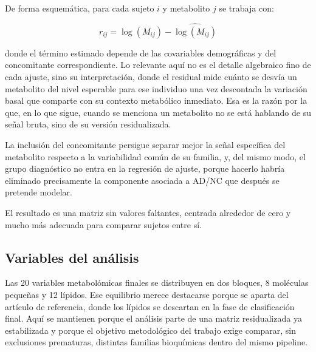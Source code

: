 De forma esquemática, para cada sujeto $i$ y metabolito $j$ se trabaja con:

\begin{equation}\label{eq:residuales}
r_{ij} = \log(M_{ij}) - \widehat{\log(M_{ij})}
\end{equation}

donde el término estimado depende de las covariables demográficas y del concomitante correspondiente. Lo relevante aquí
no es el detalle algebraico fino de cada ajuste, sino su interpretación, donde el residual mide cuánto se desvía un
metabolito del nivel esperable para ese individuo una vez descontada la variación basal que comparte con su contexto
metabólico inmediato. Esa es la razón por la que, en lo que sigue, cuando se menciona un metabolito no se está hablando
de su señal bruta, sino de su versión residualizada.

La inclusión del concomitante persigue separar mejor la señal específica del metabolito respecto a la variabilidad común
de su familia, y, del mismo modo, el grupo diagnóstico no entra en la regresión de ajuste, porque hacerlo habría
eliminado precisamente la componente asociada a AD/NC que después se pretende modelar.

El resultado es una matriz sin valores faltantes, centrada alrededor de cero y mucho más adecuada para comparar sujetos
entre sí.

\subsection{Variables del análisis}\label{sec:variables}

Las 20 variables metabolómicas finales se distribuyen en dos bloques, 8 moléculas pequeñas y 12 lípidos. Ese equilibrio
merece destacarse porque se aparta del artículo de referencia, donde los lípidos se descartan en la fase de
clasificación final. Aquí se mantienen porque el análisis parte de una matriz residualizada ya estabilizada y porque el
objetivo metodológico del trabajo exige comparar, sin exclusiones prematuras, distintas familias bioquímicas dentro del
mismo pipeline.

